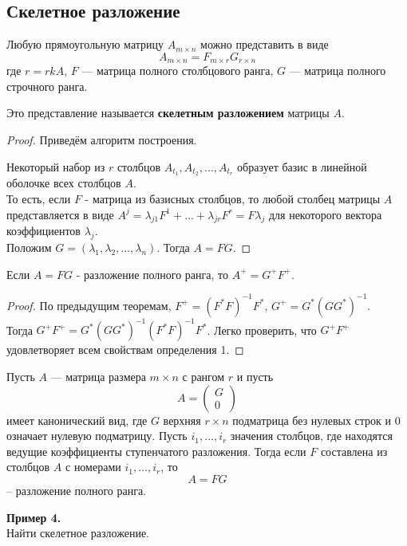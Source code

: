 \subsection{Скелетное разложение}
\begin{statement}
Любую прямоугольную матрицу $A_{m \times n}$ можно представить в виде 
$$A_{m \times n}=F_{m \times r}G_{r \times n}$$
где $r=rkA$, $F$ --- матрица полного столбцового ранга, $G$ --- матрица полного строчного ранга.

Это представление называется \textbf{скелетным разложением} матрицы $A$.
\end{statement}
\begin{proof}
Приведём алгоритм построения.

Некоторый набор из $r$ столбцов $A_{t_1}, A_{t_2},\ldots, A_{t_r}$ образует базис в линейной оболочке всех столбцов $A$.\\
То есть, если $F$ - матрица из базисных столбцов, то любой столбец матрицы $A$ представляется в виде $A^j=\lambda_{j1}F^1+\ldots+\lambda_{jr}F^r=F\lambda_j$ для некоторого вектора коэффициентов $\lambda_j$.\\
Положим $G=(\lambda_1, \lambda_2,\ldots, \lambda_n)$. Тогда $A=FG$.
\end{proof}
\begin{theorem}
    Если $A=FG$ - разложение полного ранга, то $A^+=G^+F^+$.
\end{theorem}
\begin{proof}
    По предыдущим теоремам, $F^+=(F^*F)^{-1}F^*$, $G^+=G^*(GG^*)^{-1}$.\\
Тогда $G^+F^+=G^*(GG^*)^{-1}(F^*F)^{-1}F^*$. Легко проверить, что $G^+F^+$ удовлетворяет всем свойствам определения 1.
\end{proof}
\begin{theorem}
    Пусть $A $ --- матрица размера $m\times n$
с рангом $r$ и пусть
$$
A = \left( \begin{array}{c} G \\ 0\end{array} \right)
$$
имеет канонический вид,
где $G$ верхняя $r\times n$ подматрица без нулевых строк и
$0$ означает нулевую подматрицу. Пусть $i_1, \dots ,i_r$ значения столбцов, где находятся ведущие коэффициенты ступенчатого разложения. Тогда если $F$ составлена из столбцов $A$ с номерами $i_1,
\dots , i_r$, то
$$
A = FG
$$
-- разложение полного ранга.
\end{theorem}
\textbf{Пример 4.}\\
Найти скелетное разложение.\\
